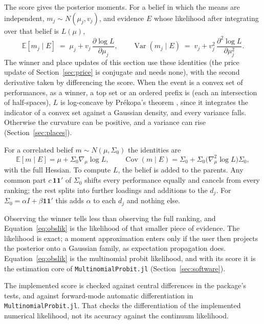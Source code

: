 \documentclass[11pt]{article}
\begin{document}
The score gives the posterior moments. For a belief in which the
means are independent, $m_j\sim N(\mu_j,v_j)$, and evidence $E$ whose
likelihood after integrating over that belief is $L(\mu)$,
\begin{equation}
\mathbb{E}[m_j\mid E]\;=\;\mu_j+v_j\,\frac{\partial\log L}{\partial\mu_j},
\qquad
\operatorname{Var}(m_j\mid E)\;=\;v_j+v_j^2\,\frac{\partial^2\log L}{\partial\mu_j^2}.
\label{eq:moments}
\end{equation}
The winner and place updates of this section use these identities
(the price update of Section~\ref{sec:price} is conjugate and needs
none), with the second derivative taken by differencing the score.
When the event is a convex set of performances, as a winner, a top
set or an ordered prefix is (each an intersection of half-spaces),
$L$ is log-concave by Pr\'ekopa's theorem \citep{prekopa1973}, since
it integrates the indicator of a convex set against a Gaussian
density, and every variance falls. Otherwise the curvature can be positive, and a variance can
rise (Section~\ref{sec:places}).

For a correlated belief $m\sim N(\mu,\Sigma_0)$ the identities are
\begin{equation}
\mathbb{E}[m\mid E]=\mu+\Sigma_0\nabla_\mu\log L,
\qquad
\operatorname{Cov}(m\mid E)=\Sigma_0+\Sigma_0\bigl(\nabla_\mu^2\log L\bigr)\Sigma_0,
\label{eq:moments-full}
\end{equation}
with the full Hessian. To compute $L$, the belief is added to the
parents. Any common part $c\,\mathbf{1}\mathbf{1}'$ of $\Sigma_0$
shifts every performance equally and cancels from every ranking; the
rest splits into further loadings and additions to the $d_j$. For
$\Sigma_0=\alpha I+\beta\mathbf{1}\mathbf{1}'$ this adds $\alpha$ to
each $d_j$ and nothing else.

Observing the winner tells less than observing the full
ranking, and Equation~\eqref{eq:obslik} is the likelihood of that
smaller piece of evidence. The likelihood is exact; a moment
approximation enters only if the user then projects the posterior
onto a Gaussian family, as expectation propagation does.
Equation~\eqref{eq:obslik} is the
multinomial probit likelihood, and with its score it is the
estimation core of \texttt{MultinomialProbit.jl} (Section~\ref{sec:software}).

The implemented score is checked against central differences in the
package's tests, and against forward-mode automatic differentiation
in \texttt{MultinomialProbit.jl}. That checks the differentiation of
the implemented numerical likelihood, not its accuracy against the
continuum likelihood.
\end{document}
